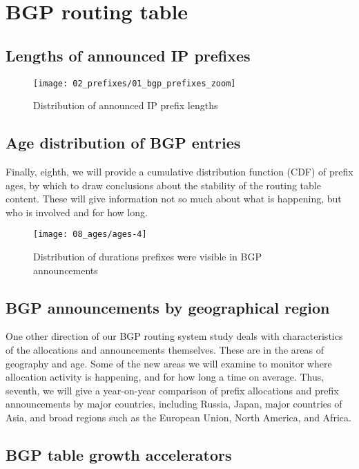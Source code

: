 \section{BGP routing table}
\label{sec:bgp}


\subsection{Lengths of announced IP prefixes}

\begin{figure}[htbp]
	\centering
		\texttt{[image: 02\_prefixes/01\_bgp\_prefixes\_zoom]}
	\caption{Distribution of announced IP prefix lengths}
	\label{fig:bgp prefix distribution}
\end{figure}

\subsection{Age distribution of BGP entries}
Finally, eighth, we will provide a cumulative distribution function (CDF) of prefix ages, by which to draw conclusions about the stability of the routing table content. These will give information not so much about what is happening, but who is involved and for how long.
	
\begin{figure}[htbp]
	\centering
		\texttt{[image: 08\_ages/ages-4]}
	\caption{Distribution of durations prefixes were visible in BGP announcements}
	\label{fig:bgp ages}
\end{figure}
	
\subsection{BGP announcements by geographical region}
One other direction of our BGP routing system study deals with characteristics of the allocations and announcements themselves.  These are in the areas of geography and age.  Some of the new areas we will examine to monitor where allocation activity is happening, and for how long a time on average.  Thus, seventh, we will give a year-on-year comparison of prefix allocations and prefix announcements by major countries, including Russia, Japan, major countries of Asia, and broad regions such as the European Union, North America, and Africa.




\subsection{BGP table growth accelerators}

